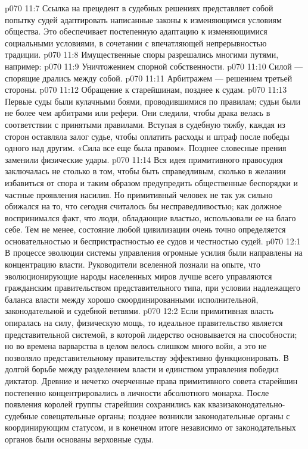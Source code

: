 \vs p070 11:7 Ссылка на прецедент в судебных решениях представляет собой попытку судей адаптировать написанные законы к изменяющимся условиям общества. Это обеспечивает постепенную адаптацию к изменяющимися социальными условиями, в сочетании с впечатляющей непрерывностью традиции.
\vs p070 11:8 \pc Имущественные споры разрешались многими путями, например:
\vs p070 11:9 \bibnobreakspace Уничтожением спорной собственности.
\vs p070 11:10 \bibnobreakspace Силой --- спорящие дрались между собой.
\vs p070 11:11 \bibnobreakspace Арбитражем --- решением третьей стороны.
\vs p070 11:12 \bibnobreakspace Обращение к старейшинам, позднее к судам.
\vs p070 11:13 \pc Первые суды были кулачными боями, проводившимися по правилам; судьи были не более чем арбитрами или рефери. Они следили, чтобы драка велась в соответствии с принятыми правилами. Вступая в судебную тяжбу, каждая из сторон оставляла залог судье, чтобы оплатить расходы и штраф после победы одного над другим. «Сила все еще была правом». Позднее словесные прения заменили физические удары.
\vs p070 11:14 Вся идея примитивного правосудия заключалась не столько в том, чтобы быть справедливым, сколько в желании избавиться от спора и таким образом предупредить общественные беспорядки и частные проявления насилия. Но примитивный человек не так уж сильно обижался на то, что сегодня считалось бы несправедливостью; как должное воспринимался факт, что люди, обладающие властью, использовали ее на благо себе. Тем не менее, состояние любой цивилизации очень точно определяется основательностью и беспристрастностью ее судов и честностью судей.
\vs p070 12:1 В процессе эволюции системы управления огромные усилия были направлены на концентрацию власти. Руководители вселенной познали на опыте, что эволюционирующие народы населенных миров лучше всего управляются гражданским правительством представительного типа, при условии надлежащего баланса власти между хорошо скоординированными исполнительной, законодательной и судебной ветвями.
\vs p070 12:2 \pc Если примитивная власть опиралась на силу, физическую мощь, то идеальное правительство является представительной системой, в которой лидерство основывается на способности; но во времена варварства в целом велось слишком много войн, а это не позволяло представительному правительству эффективно функционировать. В долгой борьбе между разделением власти и единством управления победил диктатор. Древние и нечетко очерченные права примитивного совета старейшин постепенно концентрировались в личности абсолютного монарха. После появления королей группы старейшин сохранились как квазизаконодательно\hyp{}судебные совещательные органы; позднее возникли законодательные органы с координирующим статусом, и в конечном итоге независимо от законодательных органов были основаны верховные суды.
